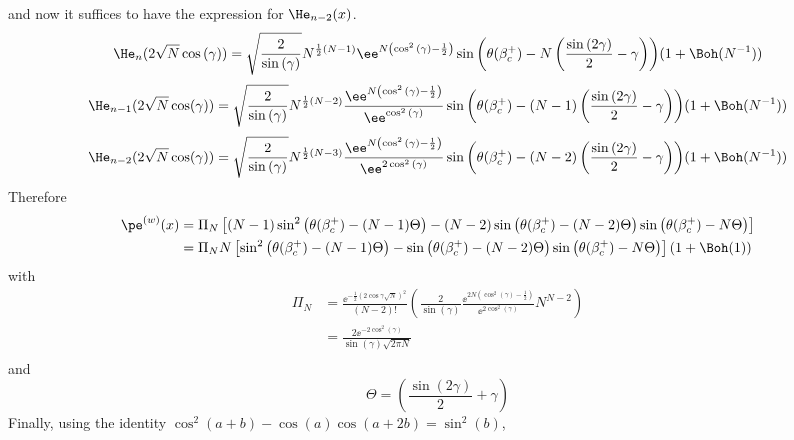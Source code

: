 and now it suffices to have the expression for $\He_{n-2}(x)$.
\begin{equation}
	\He_n(2\sqrt{N}\cos{(\gamma)}) = \sqrt{\frac{2}{\sin{(\gamma)}}}
	N^{\frac{1}{2} \left(N - 1\right)}
	\ee^{N\left(\cos^2{(\gamma)} - \frac{1}{2} \right)} 
	\sin{
		\left(
		\theta(\beta_c^+) 
		-N\left(\frac{\sin{(2\gamma)}}{2}
		-\gamma\right)
		\right)
	} 
	(1 + \Boh(N^{-1}))
\end{equation}
\begin{equation}
	\He_{n-1}(2\sqrt{N}\cos(\gamma)) = \sqrt{\frac{2}{\sin{(\gamma)}}}
	N^{\frac{1}{2} \left(N -2\right)}
	\frac{\ee^{N\left(\cos^2{(\gamma)} - \frac{1}{2} \right)}}{\ee^{\cos^2{(\gamma)}}}
	\sin{
		\left(
		\theta(\beta_c^+) 
		-(N-1)\left(\frac{\sin{(2\gamma)}}{2}
		-\gamma\right)
		\right)
	} 
	(1 + \Boh(N^{-1}))
\end{equation}
\begin{equation}
	\He_{n-2}(2\sqrt{N}\cos(\gamma)) = \sqrt{\frac{2}{\sin{(\gamma)}}}
	N^{\frac{1}{2} \left(N - 3\right)}
	\frac{\ee^{N\left(\cos^2{(\gamma)} - \frac{1}{2} \right)}}{\ee^{2\cos^2{(\gamma)}}}
	\sin{
		\left(
		\theta(\beta_c^+) 
		-(N-2)\left(\frac{\sin{(2\gamma)}}{2}
		-\gamma\right)
		\right)
	} 
	(1 + \Boh(N^{-1}))
\end{equation}
Therefore
\begin{align}
		\pe^{(w)}(x) & =  \Pi_N \left[(N-1) \sin^2{\left(\theta(\beta_c^+)-(N-1)\Theta \right)} - (N-2) \sin{\left(\theta(\beta_c^+)-(N-2)\Theta\right)}  \sin{\left(\theta(\beta_c^+)-N\Theta \right)} \right] \\
		& =  \Pi_N N \left[\sin^2{\left(\theta(\beta_c^+)-(N-1)\Theta \right)} - \sin{\left(\theta(\beta_c^+)-(N-2)\Theta\right)}  \sin{\left(\theta(\beta_c^+)-N\Theta \right)} \right] \left(1 + \Boh(1) \right)
\end{align}
with
\begin{align}
	\Pi_N & = \frac{\ee^{-\frac{1}{2}\left(2\cos{\gamma}\sqrt{N}\right)^2}}{(N-2)!} \left( \frac{2}{\sin(\gamma)} 	\frac{\ee^{2N\left(\cos^2{(\gamma)} - \frac{1}{2} \right)}}{\ee^{2\cos^2{(\gamma)}}} N^{N-2}\right) \\
	& = \frac{2 \ee^{-2\cos^2{(\gamma)}}}{\sin(\gamma) \sqrt{2\pi N}} \\
\end{align} 
and
\begin{equation}
	\Theta = \left(\frac{\sin{(2\gamma)}}{2}+\gamma\right)
\end{equation}
Finally, using the identity $\cos^2(a + b) - \cos(a)\cos(a+2b) = \sin^2(b)$,
